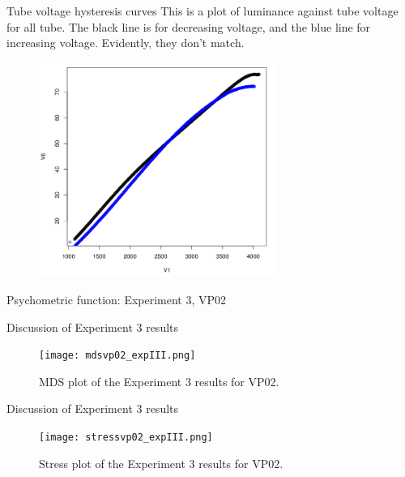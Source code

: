 \documentclass{beamer}
\begin{document}
\begin{frame}[t]{Tube voltage hysteresis curves}
This is a plot of luminance against tube voltage for all tube. The black line is for decreasing voltage, and the blue line for increasing voltage. Evidently, they don't match.
\begin{figure}[c]
\includegraphics[height=7cm]{allhysteresis.png}
\end{figure}
\end{frame}

\begin{frame}[t]{Psychometric function: Experiment 3, VP02}
\end{frame}

\begin{frame}[t]{Discussion of Experiment 3 results}
\begin{figure}[c]
\texttt{[image: mdsvp02\_expIII.png]}
\caption{MDS plot of the Experiment 3 results for VP02.}
\end{figure}
\end{frame}

\begin{frame}[t]{Discussion of Experiment 3 results}
\begin{figure}[c]
\texttt{[image: stressvp02\_expIII.png]}
\caption{Stress plot of the Experiment 3 results for VP02.}
\end{figure}
\end{frame}
\end{document}
